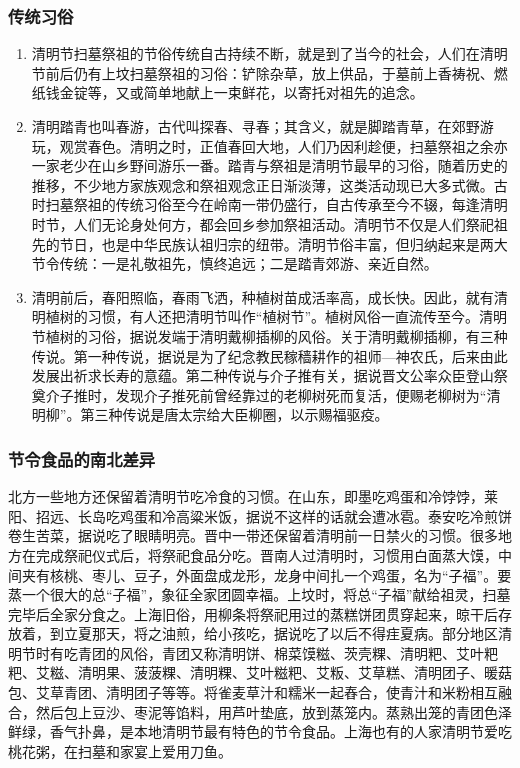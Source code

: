\subsubsection{传统习俗}
\begin{enumerate}
\item 
清明节扫墓祭祖的节俗传统自古持续不断，就是到了当今的社会，人们在清明节前后仍有上坟扫墓祭祖的习俗：铲除杂草，放上供品，于墓前上香祷祝、燃纸钱金锭等，又或简单地献上一束鲜花，以寄托对祖先的追念。
\item 
清明踏青也叫春游，古代叫探春、寻春；其含义，就是脚踏青草，在郊野游玩，观赏春色。清明之时，正值春回大地，人们乃因利趁便，扫墓祭祖之余亦一家老少在山乡野间游乐一番。踏青与祭祖是清明节最早的习俗，随着历史的推移，不少地方家族观念和祭祖观念正日渐淡薄，这类活动现已大多式微。古时扫墓祭祖的传统习俗至今在岭南一带仍盛行，自古传承至今不辍，每逢清明时节，人们无论身处何方，都会回乡参加祭祖活动。清明节不仅是人们祭祀祖先的节日，也是中华民族认祖归宗的纽带。清明节俗丰富，但归纳起来是两大节令传统：一是礼敬祖先，慎终追远；二是踏青郊游、亲近自然。
\item 
清明前后，春阳照临，春雨飞洒，种植树苗成活率高，成长快。因此，就有清明植树的习惯，有人还把清明节叫作“植树节”。植树风俗一直流传至今。清明节植树的习俗，据说发端于清明戴柳插柳的风俗。关于清明戴柳插柳，有三种传说。第一种传说，据说是为了纪念教民稼穑耕作的祖师—神农氏，后来由此发展出祈求长寿的意蕴。第二种传说与介子推有关，据说晋文公率众臣登山祭奠介子推时，发现介子推死前曾经靠过的老柳树死而复活，便赐老柳树为“清明柳”。第三种传说是唐太宗给大臣柳圈，以示赐福驱疫。    
\end{enumerate}

\subsubsection{节令食品的南北差异}
北方一些地方还保留着清明节吃冷食的习惯。在山东，即墨吃鸡蛋和冷饽饽，莱阳、招远、长岛吃鸡蛋和冷高粱米饭，据说不这样的话就会遭冰雹。泰安吃冷煎饼卷生苦菜，据说吃了眼睛明亮。晋中一带还保留着清明前一日禁火的习惯。很多地方在完成祭祀仪式后，将祭祀食品分吃。晋南人过清明时，习惯用白面蒸大馍，中间夹有核桃、枣儿、豆子，外面盘成龙形，龙身中间扎一个鸡蛋，名为“子福”。要蒸一个很大的总“子福”，象征全家团圆幸福。上坟时，将总“子福”献给祖灵，扫墓完毕后全家分食之。上海旧俗，用柳条将祭祀用过的蒸糕饼团贯穿起来，晾干后存放着，到立夏那天，将之油煎，给小孩吃，据说吃了以后不得疰夏病。部分地区清明节时有吃青团的风俗，青团又称清明饼、棉菜馍糍、茨壳粿、清明粑、艾叶粑粑、艾糍、清明果、菠菠粿、清明粿、艾叶糍粑、艾粄、艾草糕、清明团子、暖菇包、艾草青团、清明团子等等。将雀麦草汁和糯米一起舂合，使青汁和米粉相互融合，然后包上豆沙、枣泥等馅料，用芦叶垫底，放到蒸笼内。蒸熟出笼的青团色泽鲜绿，香气扑鼻，是本地清明节最有特色的节令食品。上海也有的人家清明节爱吃桃花粥，在扫墓和家宴上爱用刀鱼。

